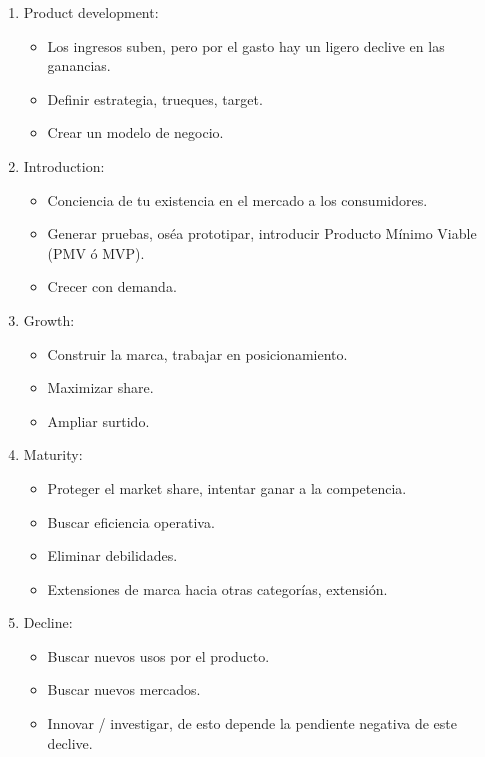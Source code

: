 \begin{enumerate}
    \item Product development: 
        \begin{itemize}
            \item Los ingresos suben, pero por el gasto hay un ligero declive en las ganancias. 
            \item Definir estrategia, trueques, target.
            \item Crear un modelo de negocio.
        \end{itemize}
        
    \item Introduction: 
        \begin{itemize}
            \item Conciencia de tu existencia en el mercado a los consumidores.
            \item Generar pruebas, oséa prototipar, introducir Producto Mínimo Viable (PMV ó MVP).
            \item Crecer con demanda.
        \end{itemize}

    \item Growth: 
        \begin{itemize}
            \item Construir la marca, trabajar en posicionamiento.
            \item Maximizar share.
            \item Ampliar surtido.
        \end{itemize}

    \item Maturity: 
        \begin{itemize}
            \item Proteger el market share, intentar ganar a la competencia.
            \item Buscar eficiencia operativa.
            \item Eliminar debilidades.
            \item Extensiones de marca hacia otras categorías, extensión.
        \end{itemize}

    \item Decline: 
        \begin{itemize}
            \item Buscar nuevos usos por el producto. 
            \item Buscar nuevos mercados.
            \item Innovar / investigar, de esto depende la pendiente negativa de este declive.
        \end{itemize}
\end{enumerate}
